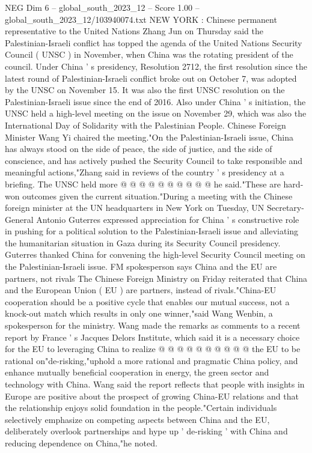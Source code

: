 \begin{textsample}{NEG Dim 6 – global\_south\_2023\_12 – Score 1.00 – global\_south\_2023\_12/103940074.txt}  \label{ex:f6_neg_316}
NEW YORK : Chinese permanent representative to the United Nations Zhang Jun on Thursday said the Palestinian-Israeli conflict has topped the agenda of the United Nations Security Council ( UNSC ) in November, when China was the rotating president of the council.
Under China ' s presidency, Resolution 2712, the first resolution since the latest round of Palestinian-Israeli conflict broke out on October 7, was adopted by the UNSC on November 15.
It was also the first UNSC resolution on the Palestinian-Israeli issue since the end of 2016.
Also under China ' s initiation, the UNSC held a high-level meeting on the issue on November 29, which was also the International Day of Solidarity with the Palestinian People.
Chinese Foreign Minister Wang Yi chaired the meeting."On the Palestinian-Israeli issue, China has always stood on the side of peace, the side of justice, and the side of conscience, and has actively pushed the Security Council to take responsible and meaningful actions,"Zhang said in reviews of the country ' s presidency at a briefing.
The UNSC held more @ @ @ @ @ @ @ @ @ @ he said."These are hard-won outcomes given the current situation."During a meeting with the Chinese foreign minister at the UN headquarters in New York on Tuesday, UN Secretary-General Antonio Guterres expressed appreciation for China ' s constructive role in pushing for a political solution to the Palestinian-Israeli issue and alleviating the humanitarian situation in Gaza during its Security Council presidency.
Guterres thanked China for convening the high-level Security Council meeting on the Palestinian-Israeli issue.
FM spokesperson says China and the EU are partners, not rivals The Chinese Foreign Ministry on Friday reiterated that China and the European Union ( EU ) are partners, instead of rivals."China-EU cooperation should be a positive cycle that enables our mutual success, not a knock-out match which results in only one winner,"said Wang Wenbin, a spokesperson for the ministry.
Wang made the remarks as comments to a recent report by France ' s Jacques Delors Institute, which said it is a necessary choice for the EU to leveraging China to realize @ @ @ @ @ @ @ @ @ @ the EU to be rational on"de-risking,"uphold a more rational and pragmatic China policy, and enhance mutually beneficial cooperation in energy, the green sector and technology with China.
Wang said the report reflects that people with insights in Europe are positive about the prospect of growing China-EU relations and that the relationship enjoys solid foundation in the people."Certain individuals selectively emphasize on competing aspects between China and the EU, deliberately overlook partnerships and hype up ' de-risking ' with China and reducing dependence on China,"he noted.

\end{textsample}
